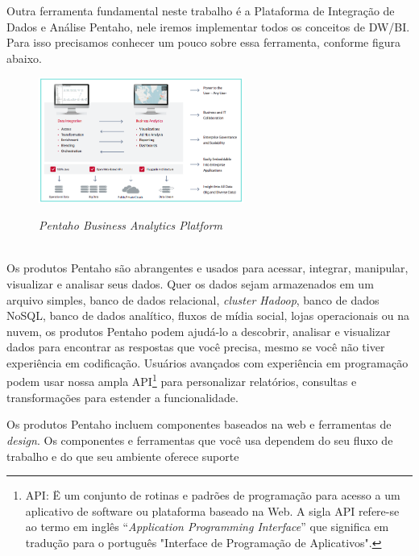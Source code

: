 Outra ferramenta fundamental neste trabalho \'{e} a Plataforma de Integra\c{c}\~{a}o de Dados e An\'{a}lise Pentaho, nele iremos implementar todos os conceitos de DW/BI. Para isso precisamos conhecer um pouco sobre essa ferramenta, conforme figura abaixo.

\begin{figure}[H]
	\vspace*{0,2cm}
    \centering
    \caption{\textit{Pentaho Business Analytics Platform}}
    \includegraphics[width=0.6\textwidth]{./04-figuras/figura-15}
    \label{fig:ilustfig15}
\end{figure}
\vspace*{-0,9cm}
{\raggedright {}}\\

Os produtos Pentaho s\~{a}o abrangentes e usados para acessar, integrar, manipular, visualizar e analisar seus dados. Quer os dados sejam armazenados em um arquivo simples, banco de dados relacional, \textit{cluster Hadoop}, banco de dados NoSQL, banco de dados anal\'{i}tico, fluxos de m\'{i}dia social, lojas operacionais ou na nuvem, os produtos Pentaho podem ajud\'{a}-lo a descobrir, analisar e visualizar dados para encontrar as respostas que você precisa, mesmo se você n\~{a}o tiver experiência em codifica\c{c}\~{a}o. 
Usu\'{a}rios avan\c{c}ados com experiência em programa\c{c}\~{a}o podem usar nossa ampla API\footnote{API: Ë um conjunto de rotinas e padr\~{o}es de programa\c{c}\~{a}o para acesso a um aplicativo de software ou plataforma baseado na Web. A sigla API refere-se ao termo em inglês ``\textit{Application Programming Interface}'' que significa em tradu\c{c}\~{a}o para o português "Interface de Programa\c{c}\~{a}o de Aplicativos".} para personalizar relat\'orios, consultas e transforma\c{c}\~{o}es para estender a funcionalidade.

Os produtos Pentaho incluem componentes baseados na web e ferramentas de \textit{design}. Os componentes e ferramentas que você usa dependem do seu fluxo de trabalho e do que seu ambiente oferece suporte

